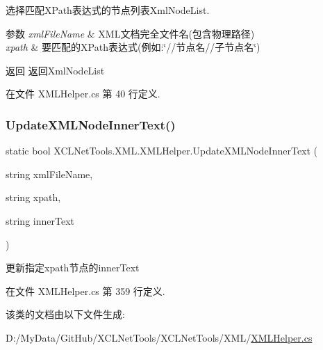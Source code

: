 选择匹配\+X\+Path表达式的节点列表\+Xml\+Node\+List. 


\begin{DoxyParams}{参数}
{\em xml\+File\+Name} & X\+M\+L文档完全文件名(包含物理路径)\\
\hline
{\em xpath} & 要匹配的\+X\+Path表达式(例如\+:\char`\"{}//节点名//子节点名\char`\"{})\\
\hline
\end{DoxyParams}
\begin{DoxyReturn}{返回}
返回\+Xml\+Node\+List
\end{DoxyReturn}


在文件 X\+M\+L\+Helper.\+cs 第 40 行定义.

\mbox{\label{class_x_c_l_net_tools_1_1_x_m_l_1_1_x_m_l_helper_a680dbf5fec70c3e5e30d0f75fedc2d3c}} 
\subsubsection{\texorpdfstring{Update\+X\+M\+L\+Node\+Inner\+Text()}{UpdateXMLNodeInnerText()}}
{\footnotesize\ttfamily static bool X\+C\+L\+Net\+Tools.\+X\+M\+L.\+X\+M\+L\+Helper.\+Update\+X\+M\+L\+Node\+Inner\+Text (\begin{DoxyParamCaption}\item[{string}]{xml\+File\+Name,  }\item[{string}]{xpath,  }\item[{string}]{inner\+Text }\end{DoxyParamCaption})\hspace{0.3cm}{\ttfamily [static]}}



更新指定xpath节点的inner\+Text 



在文件 X\+M\+L\+Helper.\+cs 第 359 行定义.



该类的文档由以下文件生成\+:\begin{DoxyCompactItemize}
\item 
D\+:/\+My\+Data/\+Git\+Hub/\+X\+C\+L\+Net\+Tools/\+X\+C\+L\+Net\+Tools/\+X\+M\+L/\hyperlink{_x_m_l_helper_8cs}{X\+M\+L\+Helper.\+cs}\end{DoxyCompactItemize}
